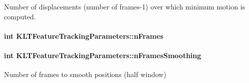 Number of displacements (number of frames-\/1) over which minimum motion is computed. 

\hypertarget{structKLTFeatureTrackingParameters_a0c3b89582f2105d0dc3da8f599518031}{
\paragraph[{n\-Frames}]{\setlength{\rightskip}{0pt plus 5cm}int K\-L\-T\-Feature\-Tracking\-Parameters\-::n\-Frames}}\label{structKLTFeatureTrackingParameters_a0c3b89582f2105d0dc3da8f599518031}
\hypertarget{structKLTFeatureTrackingParameters_ad5a4d722c17641c805483790fda819c9}{
\paragraph[{n\-Frames\-Smoothing}]{\setlength{\rightskip}{0pt plus 5cm}int K\-L\-T\-Feature\-Tracking\-Parameters\-::n\-Frames\-Smoothing}}\label{structKLTFeatureTrackingParameters_ad5a4d722c17641c805483790fda819c9}


Number of frames to smooth positions (half window) 

